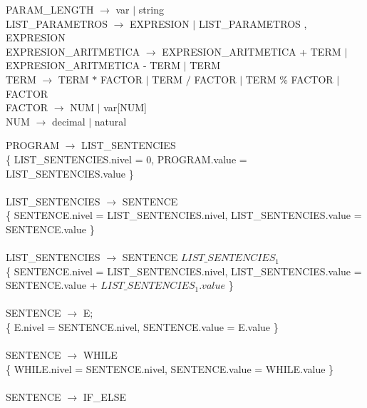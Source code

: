\documentclass[10pt,a4paper]{article}
\begin{document}
PARAM\_LENGTH $\rightarrow$ var $|$ string \\

LIST\_PARAMETROS $\rightarrow$ EXPRESION $|$ LIST\_PARAMETROS , EXPRESION \\

EXPRESION\_ARITMETICA $\rightarrow$ EXPRESION\_ARITMETICA + TERM $|$ EXPRESION\_ARITMETICA - TERM $|$ TERM \\

TERM $\rightarrow$ TERM $*$ FACTOR $|$ TERM $/$ FACTOR $|$ TERM \% FACTOR $|$ FACTOR \\

FACTOR $\rightarrow$ NUM $|$ var[NUM] \\

NUM $\rightarrow$ decimal $|$ natural


\newpage

PROGRAM $\rightarrow$ LIST\_SENTENCIES \\

\{ LIST\_SENTENCIES.nivel = 0, PROGRAM.value = LIST\_SENTENCIES.value \} \\ \\


LIST\_SENTENCIES $\rightarrow$ SENTENCE \\

\{ SENTENCE.nivel = LIST\_SENTENCIES.nivel, LIST\_SENTENCIES.value = SENTENCE.value \}  \\ \\


LIST\_SENTENCIES $\rightarrow$ SENTENCE  $LIST\_SENTENCIES_{1}$ \\

\{ SENTENCE.nivel = LIST\_SENTENCIES.nivel, LIST\_SENTENCIES.value = SENTENCE.value + $LIST\_SENTENCIES_{1}.value$  \} \\  \\


SENTENCE $\rightarrow$  E; \\ 

\{ E.nivel = SENTENCE.nivel, SENTENCE.value = E.value \}  \\ \\

SENTENCE $\rightarrow$  WHILE  \\ 

\{ WHILE.nivel = SENTENCE.nivel, SENTENCE.value = WHILE.value \}  \\ \\

SENTENCE $\rightarrow$  IF\_ELSE  \\ 
\end{document}
